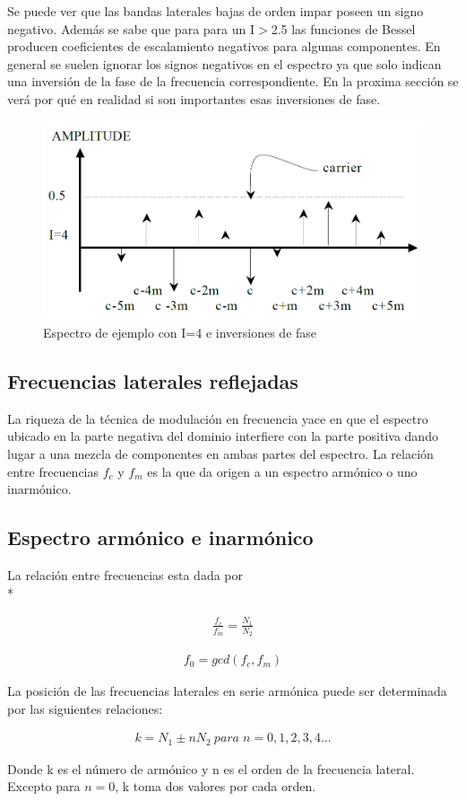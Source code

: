 \documentclass[assd_tp2_main.tex]{subfiles}
\begin{document}
{Se puede ver que las bandas laterales bajas de orden impar poseen un signo negativo. Además se sabe que para para un I$>$2.5
las funciones de Bessel producen coeficientes de escalamiento negativos para algunas componentes.
En general se suelen ignorar los signos negativos en el espectro ya que solo indican una inversión de la fase de la frecuencia correspondiente. En la proxima sección se verá por qué en realidad si son importantes esas inversiones de fase.
\begin{figure}[H]
\centering
\includegraphics[width=0.4\linewidth]{graficos/EJ4/signos.png}
\caption{Espectro de ejemplo con I=4 e inversiones de fase}
\label{fig:signos}
\end{figure}

\subsection{Frecuencias laterales reflejadas}
La riqueza de la técnica de modulación en frecuencia yace en que el espectro ubicado en la parte negativa del dominio interfiere con la parte positiva dando lugar a una mezcla de componentes en ambas partes del espectro. La relación entre frecuencias $f_c$ y $f_m$ es la que da origen a un espectro armónico o uno inarmónico.
\subsection{Espectro armónico e inarmónico}
La relación entre frecuencias esta dada por \\*

\begin{eqnarray*}
\displaystyle \frac{f_c}{f_m}=\frac{N_1}{N_2} 
\end{eqnarray*}
 
\begin{eqnarray*}
\displaystyle f_0=gcd(f_c,f_m)
\end{eqnarray*}
 
La posición de las frecuencias laterales en serie armónica puede ser determinada por las siguientes relaciones:

\begin{eqnarray*}
\displaystyle k = N_1 \pm nN_2 \: para\; n=0,1,2,3,4...
\end{eqnarray*}
\par
Donde k es el  número de armónico y n es el orden de la frecuencia lateral.
Excepto para $n=0$, k toma dos valores por cada orden.

}
\end{document}
